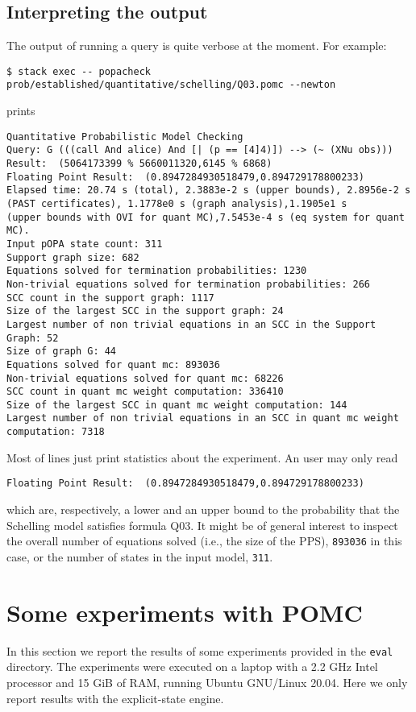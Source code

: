 \documentclass[9pt,a4paper]{article}
\begin{document}
\subsection{Interpreting the output}
\label{sec:output}
The output of running a query is quite verbose at the moment. For example: 
\begin{verbatim}
$ stack exec -- popacheck prob/established/quantitative/schelling/Q03.pomc --newton
\end{verbatim}
prints 
\begin{verbatim}
Quantitative Probabilistic Model Checking
Query: G (((call And alice) And [| (p == [4]4)]) --> (~ (XNu obs)))
Result:  (5064173399 % 5660011320,6145 % 6868)
Floating Point Result:  (0.8947284930518479,0.894729178800233)
Elapsed time: 20.74 s (total), 2.3883e-2 s (upper bounds), 2.8956e-2 s (PAST certificates), 1.1778e0 s (graph analysis),1.1905e1 s 
(upper bounds with OVI for quant MC),7.5453e-4 s (eq system for quant MC).
Input pOPA state count: 311
Support graph size: 682
Equations solved for termination probabilities: 1230
Non-trivial equations solved for termination probabilities: 266
SCC count in the support graph: 1117
Size of the largest SCC in the support graph: 24
Largest number of non trivial equations in an SCC in the Support Graph: 52
Size of graph G: 44
Equations solved for quant mc: 893036
Non-trivial equations solved for quant mc: 68226
SCC count in quant mc weight computation: 336410
Size of the largest SCC in quant mc weight computation: 144
Largest number of non trivial equations in an SCC in quant mc weight computation: 7318

\end{verbatim}
Most of lines just print statistics about the experiment. An user may only read
\begin{verbatim}
Floating Point Result:  (0.8947284930518479,0.894729178800233)
\end{verbatim}
which are, respectively, a lower and an upper bound to the probability that the Schelling model satisfies formula Q03. It might be of general interest to inspect the overall number of equations solved (i.e., the size of the PPS), \verb|893036| in this case, or the number of states in the input model, \verb|311|.


\section{Some experiments with POMC}
\label{sec:exp}

In this section we report the results of some experiments
provided in the \texttt{eval} directory.
The experiments were executed on a laptop with a 2.2 GHz Intel processor
and 15 GiB of RAM, running Ubuntu GNU/Linux 20.04.
Here we only report results with the explicit-state engine.
\end{document}
